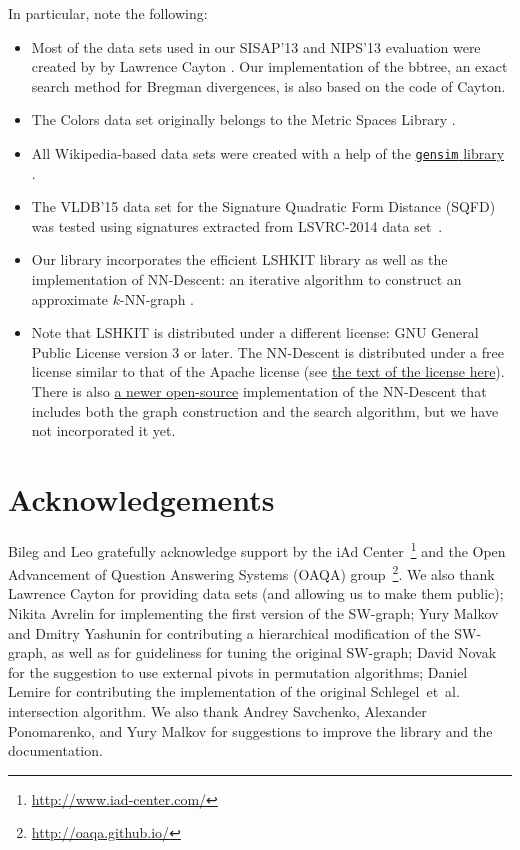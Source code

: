 \documentclass[runningheads,a4paper]{llncs}
\newcommand{\ttt}[1]{\texttt{#1}}
\newcommand{\knnns}{$k$-NN}
\begin{document}
In particular, note the following:
\begin{itemize}
\item Most of the data sets used in our SISAP'13 and NIPS'13
evaluation were created by  by Lawrence Cayton \cite{Cayton2008}.
Our implementation of the bbtree, 
an exact search method for Bregman divergences,
is also based on the code of Cayton.

\item The Colors data set originally belongs to the Metric Spaces Library \cite{LibMetricSpace}.

\item All Wikipedia-based data sets were created with a help of the \href{https://github.com/piskvorky/gensim/}{\ttt{gensim} library} \cite{rehurek_lrec}.

\item The VLDB'15 data set for the Signature Quadratic Form Distance (SQFD) \cite{Beecks:2010,Beecks:2013} 
was tested using signatures extracted from LSVRC-2014 data set~\cite{ILSVRCarxiv14}. 

\item Our library incorporates the efficient LSHKIT library
as well as the implementation of NN-Descent: 
an iterative algorithm to construct an approximate \knnns-graph \cite{dong2011efficient}.

\item Note that LSHKIT is distributed under a different license: 
GNU General Public License version 3 or later. 
The NN-Descent is distributed under a free license similar to
that of the Apache license (see \href{https://code.google.com/p/nndes/source/browse/trunk/LICENSE}{the 
text of the license here}). There is also \href{http://kgraph.org}{a newer open-source}
implementation of the NN-Descent that includes both
the graph construction and the search algorithm, but we have not incorporated it yet.

\end{itemize}

\section{Acknowledgements}
Bileg and Leo gratefully acknowledge support by the iAd Center~\footnote{\url{http://www.iad-center.com/}}
and the Open Advancement of Question Answering Systems (OAQA) group~\footnote{\url{http://oaqa.github.io/}}.
We also thank 
Lawrence Cayton for providing data sets (and allowing us to make them public);
Nikita Avrelin for implementing the first version of the SW-graph;
Yury Malkov and Dmitry Yashunin for contributing a hierarchical modification of the SW-graph, 
as well as for guideliness for tuning the original SW-graph;
David Novak for the suggestion to use external pivots in permutation algorithms;
Daniel Lemire for contributing the implementation of the original Schlegel~et~al.~\cite{schlegel2011fast}
intersection algorithm.
We also thank Andrey Savchenko, Alexander Ponomarenko, and Yury Malkov
for suggestions to improve the library and the documentation.
\end{document}
